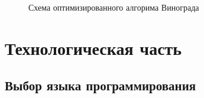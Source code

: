 \documentclass[a4paper,14pt]{report}
\begin{document}
\begin{figure}
\caption{Схема оптимизированного алгорима Винограда}
\label{fig:image}
\end{figure}


\chapter*{Технологическая часть}

\section*{Выбор языка программирования}
\end{document}
